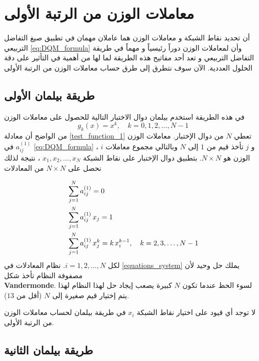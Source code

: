 \section[معاملات الوزن من الرتبة الأولى]{معاملات الوزن من الرتبة الأولى }

أن تحديد نقاط الشبكة و معاملات الوزن هما عاملان مهمان في تطبيق صيغ التفاضل التربيعي \eqref{eq:DQM_formula} وأن لمعاملات الوزن دوراً رئيسياً و مهماً في طريقة التفاضل التربيعي و تعد أحد مفاتيح هذه الطريقة لما لها من أهمية في التأثير على دقة الحلول العددية. الآن سوف نتطرق إلى طرق حساب معاملات الوزن من الرتبة الأولى


\subsection[طريقة بيلمان الأولى]{طريقة بيلمان الأولى \cite{Bellman} }

في هذه الطريقة استخدم بيلمان دوال الاختبار التالية للحصول على معاملات الوزن
\begin{equation}
	\label{test_function_1}
	g_k(x)=x^k,\quad k =0,1,2,\dots,N-1
\end{equation}
من الواضح أن معادلة \eqref{test_function_1} تعطي $N$ من دوال الإختبار. معاملات الوزن $a_{ij}^{(1)}$ في \eqref{eq:DQM_formula} ، $i$ و $j$ تأخذ قيم من $1$ إلى $N$ وبالتالي مجموع معاملات الوزن هو $N\times N$. بتطبيق دوال الإختبار على نقاط الشبكة $x_1,x_2,\dots,x_N$ ، نتيجة لذلك نحصل على $N\times N$ من المعادلات

\begin{align}
	\label{equations_system}
	&\sum_{j=1}^{N}a_{ij}^{(1)}=0\notag\\
	&\sum_{j=1}^{N}a_{ij}^{(1)}\,x_j=1\\
	&\sum_{j=1}^{N}a_{ij}^{(1)}\,x_j^k=k\,x_i^{k-1},\quad k=2,3,\dots,N-1\notag
\end{align}
لكل $i=1,2,\dots,N$. نظام المعادلات في \eqref{equations_system} يملك حل وحيد لأن مصفوفة النظام تأخذ شكل \\\textbf{Vandermonde}. لسوء الحظ عندما تكون $N$ كبيرة يصعب إيجاد حل لهذا النظام لهذا يتم إختيار قيم صغيرة إلى $N$ (أقل من $13$).

\begin{note}
	لا توجد أي قيود على اختيار نقاط الشبكة $x_i$ في طريقة بيلمان لحساب معاملات الوزن من الرتبة الأولى.
\end{note}

\subsection[طريقة بيلمان الثانية]{طريقة بيلمان الثانية \cite{Bellman} }

